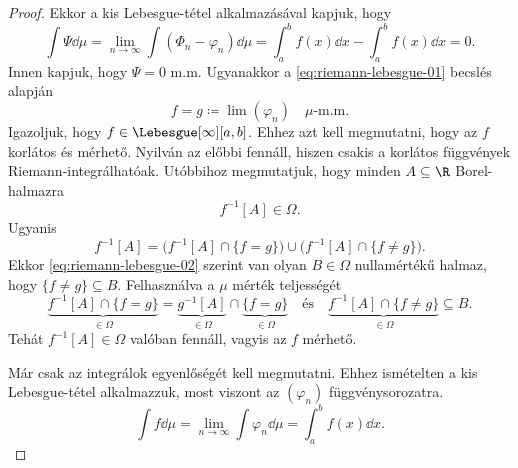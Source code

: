 \documentclass[
]{elteikthesis}[2024/04/26]
\begin{document}
\begin{proof}
		Ekkor a kis Lebesgue-tétel alkalmazásával kapjuk, hogy
		\[
			\int \Psi \dd{\mu} =
			\lim_{n \to \infty} \int (\Phi_n - \varphi_n) \dd{\mu} =
			\int_a^b f(x) \dd{x} - \int_a^b f(x) \dd{x} =
			0.
		\]
		Innen kapjuk, hogy \( \Psi = 0 \) m.m.
		Ugyanakkor a \eqref{eq:riemann-lebesgue-01} becslés alapján
		\begin{equation*}\label{eq:riemann-lebesgue-02}
			f = g \coloneq \lim(\varphi_n) \quad \mu \text{-m.m.}
			\tag{\( ** \)}
		\end{equation*}
		Igazoljuk, hogy \( f \in \Lebesgue[\infty][a, b] \).
		Ehhez azt kell megmutatni, hogy az \( f \) korlátos és mérhető.
		Nyilván az előbbi fennáll, hiszen csakis a korlátos függvények Riemann-integrálhatóak.
		Utóbbihoz megmutatjuk, hogy minden \( A \subseteq \R \) Borel-halmazra
		\[
			f^{-1}[A] \in \Omega.
		\]
		Ugyanis
		\[
			f^{-1}[A] =
			\bigl( f^{-1}[A] \cap \{ f = g \} \bigr) \cup 
			\bigl( f^{-1}[A] \cap \{ f \neq g \} \bigr).
		\]
		Ekkor \eqref{eq:riemann-lebesgue-02} szerint van olyan 
		\( B \in \Omega \) nullamértékű halmaz, 
		hogy \( \{ f \neq g \} \subseteq B \).
		Felhasználva a \( \mu \) mérték teljességét
		\[
			\underbrace{f^{-1}[A] \cap \{ f = g \}}_{\in \Omega} =
			\underbrace{g^{-1}[A]}_{\in \Omega} \cap \underbrace{\{ f = g \}}_{\in \Omega}
			\quad \text{és} \quad
			\underbrace{f^{-1}[A] \cap \{ f \neq g \}}_{\in \Omega} \subseteq B.
		\]
		Tehát \( f^{-1}[A] \in \Omega \) valóban fennáll, vagyis az \( f \) mérhető.

		Már csak az integrálok egyenlőségét kell megmutatni.
		Ehhez ismételten a kis Lebesgue-tétel alkalmazzuk, 
		most viszont az \( (\varphi_n) \) függvénysorozatra.
		\[
			\int f \dd{\mu} =
			\lim_{n \to \infty} \int \varphi_n \dd{\mu} =
			\int_a^b f(x) \dd{x}.
		\]
	\end{proof}
	
\end{document}
